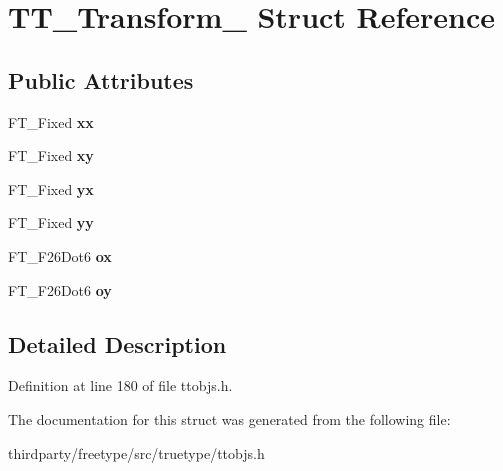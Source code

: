 \hypertarget{struct_t_t___transform__}{}\section{T\+T\+\_\+\+Transform\+\_\+ Struct Reference}
\label{struct_t_t___transform__}
\subsection*{Public Attributes}
\begin{DoxyCompactItemize}
\item 
\mbox{\label{struct_t_t___transform___acd051b7cee4f5a2531282165b06d897f}} 
F\+T\+\_\+\+Fixed {\bfseries xx}
\item 
\mbox{\label{struct_t_t___transform___af191563f12e0b182ead6196482baffba}} 
F\+T\+\_\+\+Fixed {\bfseries xy}
\item 
\mbox{\label{struct_t_t___transform___a42cfea1fc4a943c74efe02aeea4595db}} 
F\+T\+\_\+\+Fixed {\bfseries yx}
\item 
\mbox{\label{struct_t_t___transform___a1b80f8e814134f57c32ef25b64c01de4}} 
F\+T\+\_\+\+Fixed {\bfseries yy}
\item 
\mbox{\label{struct_t_t___transform___a957fe3a8db4c502773d70cfddad7461f}} 
F\+T\+\_\+\+F26\+Dot6 {\bfseries ox}
\item 
\mbox{\label{struct_t_t___transform___a0d0b9015f9252104602e9b7510d948bf}} 
F\+T\+\_\+\+F26\+Dot6 {\bfseries oy}
\end{DoxyCompactItemize}


\subsection{Detailed Description}


Definition at line 180 of file ttobjs.\+h.



The documentation for this struct was generated from the following file\+:\begin{DoxyCompactItemize}
\item 
thirdparty/freetype/src/truetype/ttobjs.\+h\end{DoxyCompactItemize}
